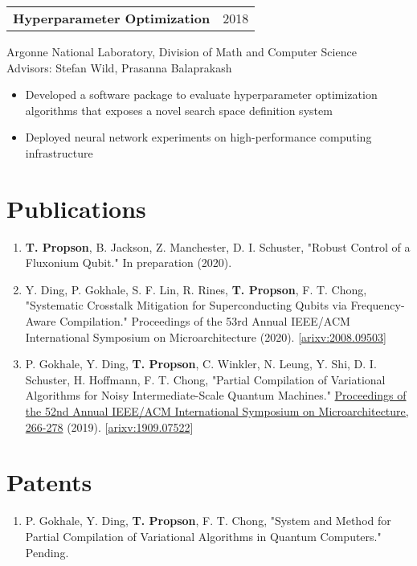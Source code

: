 \documentclass[letterpaper, 12pt]{article}
\begin{document}
\begin{tabular}{@{} L{12cm} @{} R{4.51cm} @{}}
  \textbf{Hyperparameter Optimization} & 2018\\
\end{tabular}
Argonne National Laboratory, Division of Math and Computer Science\\
Advisors: Stefan Wild, Prasanna Balaprakash
\begin{itemize}
\item Developed a software package to evaluate hyperparameter optimization algorithms
  that exposes a novel search space definition system
  \item Deployed neural network experiments on high-performance computing infrastructure 
\end{itemize}

\section{Publications}
\begin{enumerate}
\item \textbf{T. Propson}, B. Jackson, Z. Manchester, D. I. Schuster, "Robust Control
  of a Fluxonium Qubit." In preparation (2020).
\item Y. Ding, P. Gokhale, S. F. Lin, R. Rines, \textbf{T. Propson}, F. T. Chong,
  "Systematic Crosstalk Mitigation for Superconducting Qubits via Frequency-Aware Compilation."
  Proceedings of the 53rd Annual
  IEEE/ACM International Symposium on Microarchitecture (2020).
       [\href{https://arxiv.org/abs/2008.09503}{arixv:2008.09503}]
\item P. Gokhale, Y. Ding, \textbf{T. Propson}, C. Winkler, N. Leung, Y. Shi,
  D. I. Schuster, H. Hoffmann, F. T. Chong,
  "Partial Compilation of Variational Algorithms for Noisy Intermediate-Scale Quantum Machines."
  \href{https://doi.org/10.1145/3352460.3358313}{Proceedings of the 52nd Annual
    IEEE/ACM International Symposium on Microarchitecture, 266-278} (2019).
       [\href{https://arxiv.org/abs/1909.07522}{arixv:1909.07522}]
\end{enumerate}

\pagebreak

\section{Patents}
\begin{enumerate}
  \item P. Gokhale, Y. Ding, \textbf{T. Propson}, F. T. Chong, "System and Method
    for Partial Compilation of Variational Algorithms in Quantum Computers." Pending.
\end{enumerate}
\end{document}
